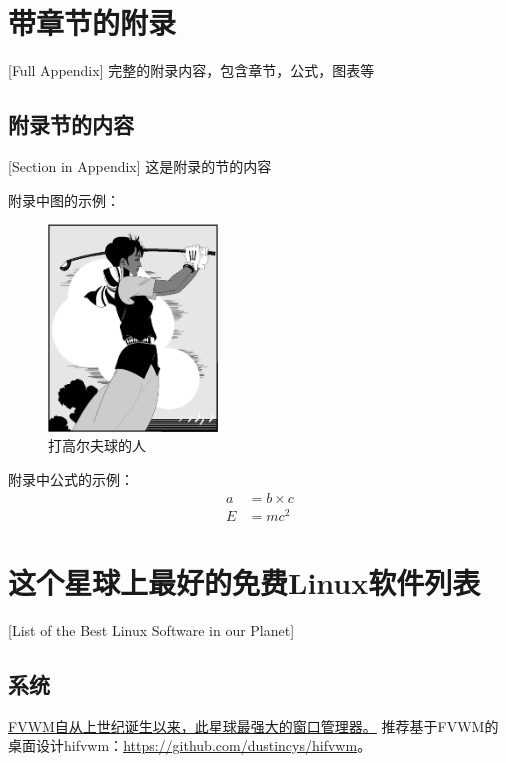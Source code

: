 \chapter{带章节的附录}[Full Appendix]%
完整的附录内容，包含章节，公式，图表等

\section{附录节的内容}[Section in Appendix]
这是附录的节的内容

附录中图的示例：
\begin{figure}[htbp]
\centering
\includegraphics[width = 0.4\textwidth]{golfer}
\caption{\xiaosi[0]打高尔夫球的人}
\end{figure}

附录中公式的示例：
\begin{align}
a & = b \times c \\
E & = m c^2
\label{eq}
\end{align}

\chapter{这个星球上最好的免费Linux软件列表}[List of the Best Linux Software in our Planet]
\section{系统}

\href{http://fvwm.org/}{FVWM自从上世纪诞生以来，此星球最强大的窗口管理器。}
推荐基于FVWM的桌面设计hifvwm：\href{https://github.com/dustincys/hifvwm}{https://github.com/dustincys/hifvwm}。

